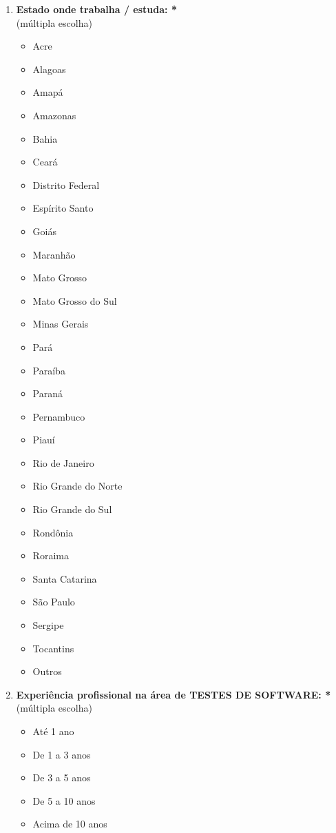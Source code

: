 \begin{enumerate}[label=\bf A\arabic*,leftmargin=1.8cm]
\begin{enumerate}[label= \arabic*]
        \item \textbf{Estado onde trabalha / estuda: *}\\
        (múltipla escolha)
        \begin{itemize}
            \item Acre
            \item Alagoas
            \item Amapá
            \item Amazonas
            \item Bahia
            \item Ceará
            \item Distrito Federal
            \item Espírito Santo
            \item Goiás
            \item Maranhão
            \item Mato Grosso
            \item Mato Grosso do Sul
            \item Minas Gerais
            \item Pará
            \item Paraíba
            \item Paraná
            \item Pernambuco
            \item Piauí
            \item Rio de Janeiro
            \item Rio Grande do Norte
            \item Rio Grande do Sul
            \item Rondônia
            \item Roraima
            \item Santa Catarina
            \item São Paulo
            \item Sergipe
            \item Tocantins
            \item Outros
        \end{itemize}
        
        
        \item \textbf{Experiência profissional na área de TESTES DE SOFTWARE: *}\\
        (múltipla escolha)
        \begin{itemize}
            \item Até 1 ano
            \item De 1 a 3 anos
            \item De 3 a 5 anos
            \item De 5 a 10 anos
            \item Acima de 10 anos
        \end{itemize}
        

\end{enumerate}
\end{enumerate}
